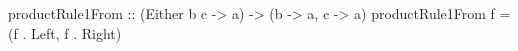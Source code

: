 \begin{code}
productRule1From
    :: (Either b c -> a)
    -> (b -> a, c -> a)
productRule1From f = (f . Left, f . Right)
\end{code}
